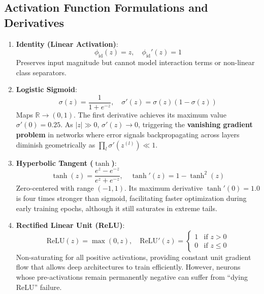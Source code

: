 \documentclass[12pt]{article}
\begin{document}
\subsection{Activation Function Formulations and Derivatives}
\begin{enumerate}
    \item \textbf{Identity (Linear Activation)}:
    \begin{equation}
    \phi_{\text{id}}(z) = z, \quad \phi_{\text{id}}'(z) = 1
    \end{equation}
    Preserves input magnitude but cannot model interaction terms or non-linear class separators.

    \item \textbf{Logistic Sigmoid}:
    \begin{equation}
    \sigma(z) = \frac{1}{1 + e^{-z}}, \quad \sigma'(z) = \sigma(z)(1 - \sigma(z))
    \end{equation}
    Maps $\mathbb{R} \to (0, 1)$. The first derivative achieves its maximum value $\sigma'(0) = 0.25$. As $|z| \gg 0$, $\sigma'(z) \to 0$, triggering the \textbf{vanishing gradient problem} in networks where error signals backpropagating across layers diminish geometrically as $\prod_{l} \sigma'(z^{(l)}) \ll 1$.

    \item \textbf{Hyperbolic Tangent ($\tanh$)}:
    \begin{equation}
    \tanh(z) = \frac{e^z - e^{-z}}{e^z + e^{-z}}, \quad \tanh'(z) = 1 - \tanh^2(z)
    \end{equation}
    Zero-centered with range $(-1, 1)$. Its maximum derivative $\tanh'(0) = 1.0$ is four times stronger than sigmoid, facilitating faster optimization during early training epochs, although it still saturates in extreme tails.

    \item \textbf{Rectified Linear Unit (ReLU)}:
    \begin{equation}
    \text{ReLU}(z) = \max(0, z), \quad \text{ReLU}'(z) = \begin{cases} 1 & \text{if } z > 0 \\ 0 & \text{if } z \le 0 \end{cases}
    \end{equation}
    Non-saturating for all positive activations, providing constant unit gradient flow that allows deep architectures to train efficiently. However, neurons whose pre-activations remain permanently negative can suffer from ``dying ReLU'' failure.
\end{enumerate}
\end{document}
